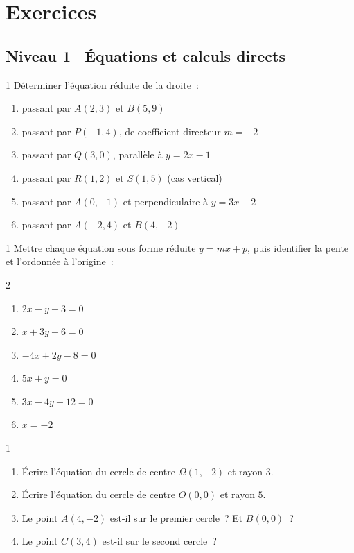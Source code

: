 \section{Exercices}

\subsection*{\quad Niveau 1 \textemdash\ \'Equations et calculs directs}

\begin{exo}{1}
D\'eterminer l'\'equation r\'eduite de la droite~:
\begin{enumerate}
  \item passant par $A(2,3)$ et $B(5,9)$
  \item passant par $P(-1,4)$, de coefficient directeur $m=-2$
  \item passant par $Q(3,0)$, parall\`ele \`a $y=2x-1$
  \item passant par $R(1,2)$ et $S(1,5)$ (cas vertical)
  \item passant par $A(0,-1)$ et perpendiculaire \`a $y=3x+2$
  \item passant par $A(-2,4)$ et $B(4,-2)$
\end{enumerate}
\end{exo}

\begin{exo}{1}
Mettre chaque \'equation sous forme r\'eduite $y=mx+p$, puis identifier
la pente et l'ordonn\'ee \`a l'origine~:
\begin{multicols}{2}
\begin{enumerate}
  \item $2x - y + 3 = 0$
  \item $x + 3y - 6 = 0$
  \item $-4x + 2y - 8 = 0$
  \item $5x + y = 0$
  \item $3x - 4y + 12 = 0$
  \item $x = -2$
\end{enumerate}
\end{multicols}
\end{exo}

\begin{exo}{1}
\begin{enumerate}
  \item \'Ecrire l'\'equation du cercle de centre $\Omega(1,-2)$ et rayon $3$.
  \item \'Ecrire l'\'equation du cercle de centre $O(0,0)$ et rayon $5$.
  \item Le point $A(4,-2)$ est-il sur le premier cercle~? Et $B(0,0)$~?
  \item Le point $C(3,4)$ est-il sur le second cercle~?
\end{enumerate}
\end{exo}

